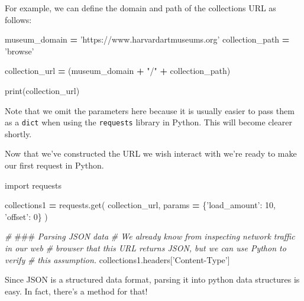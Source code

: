 \documentclass[]{book}
\newenvironment{Shaded}{\begin{snugshade}}{\end{snugshade}}
\newcommand{\AlertTok}[1]{\textcolor[rgb]{0.94,0.16,0.16}{#1}}
\newcommand{\BuiltInTok}[1]{#1}
\newcommand{\CommentTok}[1]{\textcolor[rgb]{0.56,0.35,0.01}{\textit{#1}}}
\newcommand{\DecValTok}[1]{\textcolor[rgb]{0.00,0.00,0.81}{#1}}
\newcommand{\ImportTok}[1]{#1}
\newcommand{\NormalTok}[1]{#1}
\newcommand{\OperatorTok}[1]{\textcolor[rgb]{0.81,0.36,0.00}{\textbf{#1}}}
\newcommand{\StringTok}[1]{\textcolor[rgb]{0.31,0.60,0.02}{#1}}
\begin{document}
For example, we can define the domain and path of the collections URL
as follows:

\begin{Shaded}
\begin{Highlighting}[]
\NormalTok{museum_domain }\OperatorTok{=} \StringTok{'https://www.harvardartmuseums.org'}
\NormalTok{collection_path }\OperatorTok{=} \StringTok{'browse'}

\NormalTok{collection_url }\OperatorTok{=}\NormalTok{ (museum_domain}
                  \OperatorTok{+} \StringTok{"/"}
                  \OperatorTok{+}\NormalTok{ collection_path)}

\BuiltInTok{print}\NormalTok{(collection_url)}
\end{Highlighting}
\end{Shaded}

Note that we omit the parameters here because it is usually easier to
pass them as a \texttt{dict} when using the \texttt{requests} library in Python.
This will become clearer shortly.

Now that we've constructed the URL we wish interact with we're ready
to make our first request in Python.

\begin{Shaded}
\begin{Highlighting}[]
\ImportTok{import}\NormalTok{ requests}

\NormalTok{collections1 }\OperatorTok{=}\NormalTok{ requests.get(}
\NormalTok{    collection_url,}
\NormalTok{    params }\OperatorTok{=}\NormalTok{ \{}\StringTok{'load_amount'}\NormalTok{: }\DecValTok{10}\NormalTok{,}
                  \StringTok{'offset'}\NormalTok{: }\DecValTok{0}\NormalTok{\}}
\NormalTok{)}
\end{Highlighting}
\end{Shaded}

\begin{Shaded}
\begin{Highlighting}[]
\CommentTok{# }\AlertTok{###}\CommentTok{ Parsing JSON data}
\CommentTok{# We already know from inspecting network traffic in our web}
\CommentTok{# browser that this URL returns JSON, but we can use Python to verify}
\CommentTok{# this assumption.}
\NormalTok{collections1.headers[}\StringTok{'Content-Type'}\NormalTok{]}
\end{Highlighting}
\end{Shaded}

Since JSON is a structured data format, parsing it into python data
structures is easy. In fact, there's a method for that!
\end{document}
